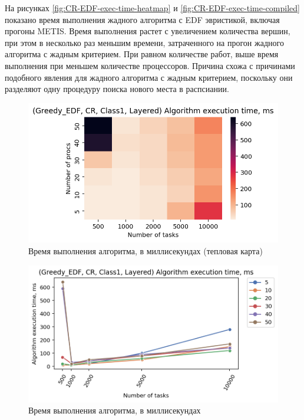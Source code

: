 На рисунках \ref{fig:CR-EDF-exec-time-heatmap} и \ref{fig:CR-EDF-exec-time-compiled} показано время выполнения жадного алгоритма с EDF эвристикой, включая прогоны METIS. Время выполнения растет с увеличением количества вершин, при этом в несколько раз меньшим времени, затраченного на прогон жадного алгоритма с жадным критерием. При равном количестве работ, выше время выполнения при меньшем количестве процессоров. Причина схожа с причинами подобного явления для жадного алгоритма с жадным критерием, поскольку они разделяют одну процедуру поиска нового места в распсиании. 

\begin{figure}[!htbp]
    \centering
    \includegraphics[width=\textwidth]{imgs/layered_class_1/CR_EDF/et_heatmap.png}
    \caption{Время выполнения алгоритма, в миллисекундах (тепловая карта)}
    \label{fig:CR-layered-EDF-exec-time-heatmap}
\end{figure}

\begin{figure}[!htbp]
    \centering
    \includegraphics[width=\textwidth]{imgs/layered_class_1/CR_EDF/tr_graph.png}
    \caption{Время выполнения алгоритма, в миллисекундах}
    \label{fig:CR-layered-EDF-exec-time-compiled}
\end{figure}

